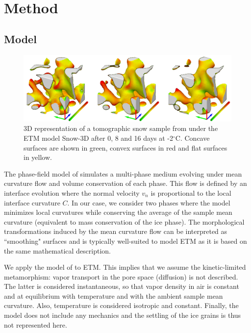 \documentclass[draft,ms]{agujournal2019}
\begin{document}
\section{Method}
\label{sec:method}
\subsection{Model}
\label{subsec:model}


\begin{figure}
    \centering
    \includegraphics[width=\linewidth]{Figures/eboni_sous_volumes_simu.pdf}
    \caption{3D representation of a tomographic snow sample from \protect{} under the ETM model Snow-3D after 0, 8 and 16 days at -2$^\circ$C. Concave surfaces are shown in green, convex surfaces in red and flat surfaces in yellow.}
    \label{fig:eboni_sous_volume}
\end{figure}

The phase-field model of  simulates a multi-phase medium evolving under mean curvature flow and volume conservation of each phase. This flow is defined by an interface evolution where the normal velocity $v_n$ is proportional to the local interface curvature $C$. In our case, we consider two phases where the model minimizes local curvatures while conserving the average of the sample mean curvature (equivalent to mass conservation of the ice phase). The morphological transformations induced by the mean curvature flow can be interpreted as ``smoothing" surfaces and is typically well-suited to model ETM as it is based on the same mathematical description. 

We apply the model of  to ETM. This implies that we assume the kinetic-limited metamorphism: vapor transport in the pore space (diffusion) is not described. The latter is considered instantaneous, so that vapor density in air is constant and at equilibrium with temperature and with the ambient sample mean curvature. Also, temperature is considered isotropic and constant. Finally, the model does not include any mechanics and the settling of the ice grains is thus not represented here.\\
\end{document}
